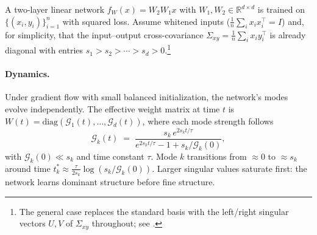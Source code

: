 \documentclass[11pt]{article}
\newcommand{\R}{\mathbb{R}}
\begin{document}
\begin{exercise}\label{ex:dln-influence}
A two-layer linear network $f_W(x) = W_2 W_1 x$ with $W_1, W_2 \in \R^{d\times d}$ is trained on $\{(x_i,y_i)\}_{i=1}^n$ with squared loss. Assume whitened inputs ($\tfrac{1}{n}\sum_i x_i x_i^\top = I$) and, for simplicity, that the input--output cross-covariance $\Sigma_{xy} = \tfrac{1}{n}\sum_i x_i y_i^\top$ is already diagonal with entries $s_1 > s_2 > \cdots > s_d > 0$.\footnote{The general case replaces the standard basis with the left/right singular vectors $U, V$ of $\Sigma_{xy}$ throughout; see .}

\paragraph{Dynamics.} Under gradient flow with small balanced initialization, the network's modes evolve independently. The effective weight matrix at time $t$ is $W(t) = \mathrm{diag}(\mathcal{G}_1(t),\dots,\mathcal{G}_d(t))$, where each mode strength follows
\begin{equation}\label{eq:dln-dynamics}
  \mathcal{G}_k(t) \;=\; \frac{s_k\,e^{2s_k t/\tau}}{e^{2s_k t/\tau} - 1 + s_k/\mathcal{G}_k(0)},
\end{equation}
with $\mathcal{G}_k(0) \ll s_k$ and time constant $\tau$. Mode $k$ transitions from $\approx 0$ to $\approx s_k$ around time $t_k^* \approx \tfrac{\tau}{2s_k}\log(s_k/\mathcal{G}_k(0))$. Larger singular values saturate first: the network learns dominant structure before fine structure.


\end{exercise}
\end{document}
